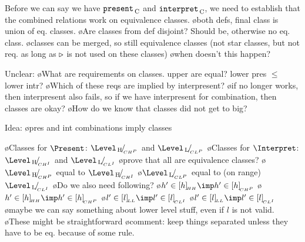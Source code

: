 

%
%

%


\bc



Before we can say we have ${\tt present}_{\, \mathrm C}$ and ${\tt interpret}_{\, \mathrm C}$, we need to establish that the combined relations work on equivalence classes.
\bl
\o both defs, final class is union of eq. classes. 
\o Are classes from def disjoint? Should be, otherwise no eq. class. 
\o classes can be merged, so still equivalence classes (not star classes, but not req. as long as $\triangleright$ is not used on these classes)
\o when doesn't this happen?
\el

Unclear:
\bl
\o What are requirements on classes. upper are equal? lower pres $\leq$ lower intr?
\o Which of these reqs are implied by interpresent?
\o if no longer works, then interpresent also fails, so if we have interpresent for combination, then classes are okay? 
\o How do we know that classes did not get to big?
\el

Idea:
\bl
\o pres and int combinations imply classes
\el

\bl
\o Classes for $\Present$: $\Eqcl{\Level\H}{CH^P}$ and $\Eqcl{\Level\L}{CL^P}$
\o Classes for $\Interpret$: $\Eqcl{\Level\H}{CH^I}$ and $\Eqcl{\Level\L}{CL^I}$
\o prove that all are equivalence classes?
\o $\Eqcl{\Level\H}{CH^P}$ equal to $\Eqcl{\Level\H}{CH^I}$
\o $\Eqcl{\Level\L}{CL^P}$ equal to (on range) $\Eqcl{\Level\L}{CL^I}$
\o Do we also need following? 
\o $h' \in \eqcl{h}{HH} \imp h' \in \eqcl{h}{CH^P}$
\o $h' \in \eqcl{h}{HH} \imp h' \in \eqcl{h}{CH^P}$
\o $l' \in \eqcl{l}{LL} \imp l' \in \eqcl{l}{CL^I}$
\o $l' \in \eqcl{l}{LL} \imp l' \in \eqcl{l}{CL^I}$
\o maybe we can say something about lower level stuff, even if  $l$ is not valid.
\o These might be straightforward
\o comment: keep things separated unless they have to be eq. because of some rule.
\el


